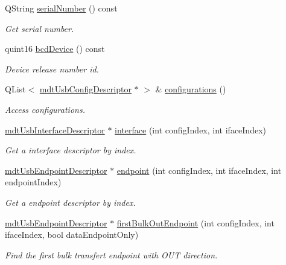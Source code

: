 \begin{DoxyCompactItemize}
Q\-String \hyperlink{classmdt_usb_device_descriptor_a458951fc9443b80e93ad126dc1b56417}{serial\-Number} () const 
\begin{DoxyCompactList}\small\item\em Get serial number. \end{DoxyCompactList}\item 
quint16 \hyperlink{classmdt_usb_device_descriptor_a6b6f21f8dfdb707bfc23d01076b7ec5e}{bcd\-Device} () const 
\begin{DoxyCompactList}\small\item\em Device release number id. \end{DoxyCompactList}\item 
Q\-List$<$ \hyperlink{classmdt_usb_config_descriptor}{mdt\-Usb\-Config\-Descriptor} $\ast$ $>$ \& \hyperlink{classmdt_usb_device_descriptor_acfc9e29a48b251012cbc38d339dc6a02}{configurations} ()
\begin{DoxyCompactList}\small\item\em Access configurations. \end{DoxyCompactList}\item 
\hyperlink{classmdt_usb_interface_descriptor}{mdt\-Usb\-Interface\-Descriptor} $\ast$ \hyperlink{classmdt_usb_device_descriptor_af1e27ae69d3c77c9dfc53a3f261caeae}{interface} (int config\-Index, int iface\-Index)
\begin{DoxyCompactList}\small\item\em Get a interface descriptor by index. \end{DoxyCompactList}\item 
\hyperlink{classmdt_usb_endpoint_descriptor}{mdt\-Usb\-Endpoint\-Descriptor} $\ast$ \hyperlink{classmdt_usb_device_descriptor_a41582e524cba87f52ca3628c0b690b8d}{endpoint} (int config\-Index, int iface\-Index, int endpoint\-Index)
\begin{DoxyCompactList}\small\item\em Get a endpoint descriptor by index. \end{DoxyCompactList}\item 
\hyperlink{classmdt_usb_endpoint_descriptor}{mdt\-Usb\-Endpoint\-Descriptor} $\ast$ \hyperlink{classmdt_usb_device_descriptor_ac1991e3d800700b2c099cd1aca2274d1}{first\-Bulk\-Out\-Endpoint} (int config\-Index, int iface\-Index, bool data\-Endpoint\-Only)
\begin{DoxyCompactList}\small\item\em Find the first bulk transfert endpoint with O\-U\-T direction. \end{DoxyCompactList}\item 

\end{DoxyCompactItemize}
